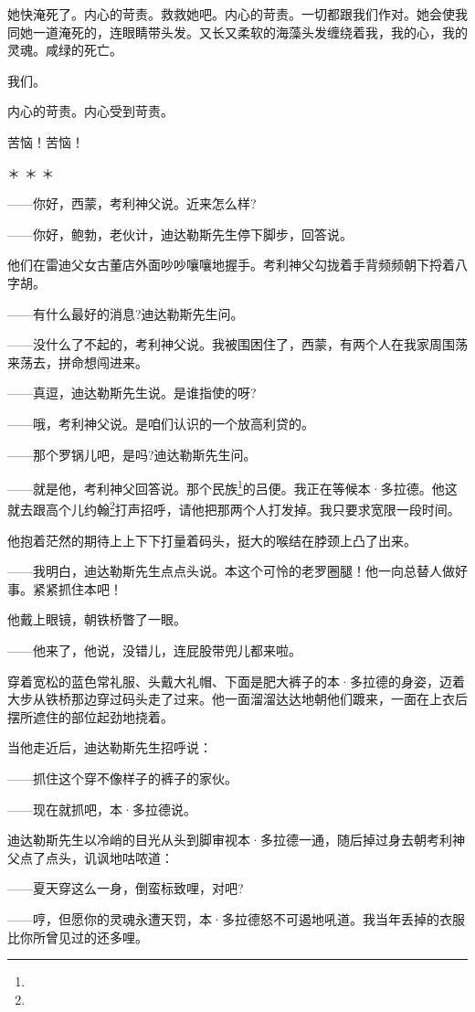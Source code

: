 \par 她快淹死了。内心的苛责。救救她吧。内心的苛责。一切都跟我们作对。她会使我同她一道淹死的，连眼睛带头发。又长又柔软的海藻头发缠绕着我，我的心，我的灵魂。咸绿的死亡。
\par 我们。
\par 内心的苛责。内心受到苛责。
\par 苦恼！苦恼！
\par ＊ ＊ ＊
\par ——你好，西蒙，考利神父说。近来怎么样?
\par ——你好，鲍勃，老伙计，迪达勒斯先生停下脚步，回答说。
\par 他们在雷迪父女古董店外面吵吵嚷嚷地握手。考利神父勾拢着手背频频朝下捋着八字胡。
\par ——有什么最好的消息?迪达勒斯先生问。
\par ——没什么了不起的，考利神父说。我被围困住了，西蒙，有两个人在我家周围荡来荡去，拼命想闯进来。
\par ——真逗，迪达勒斯先生说。是谁指使的呀?
\par ——哦，考利神父说。是咱们认识的一个放高利贷的。
\par ——那个罗锅儿吧，是吗?迪达勒斯先生问。
\par ——就是他，考利神父回答说。那个民族\footnote{}的吕便。我正在等候本·多拉德。他这就去跟高个儿约翰\footnote{}打声招呼，请他把那两个人打发掉。我只要求宽限一段时间。
\par 他抱着茫然的期待上上下下打量着码头，挺大的喉结在脖颈上凸了出来。
\par ——我明白，迪达勒斯先生点点头说。本这个可怜的老罗圈腿！他一向总替人做好事。紧紧抓住本吧！
\par 他戴上眼镜，朝铁桥瞥了一眼。
\par ——他来了，他说，没错儿，连屁股带兜儿都来啦。
\par 穿着宽松的蓝色常礼服、头戴大礼帽、下面是肥大裤子的本·多拉德的身姿，迈着大步从铁桥那边穿过码头走了过来。他一面溜溜达达地朝他们踱来，一面在上衣后摆所遮住的部位起劲地挠着。
\par 当他走近后，迪达勒斯先生招呼说：
\par ——抓住这个穿不像样子的裤子的家伙。
\par ——现在就抓吧，本·多拉德说。
\par 迪达勒斯先生以冷峭的目光从头到脚审视本·多拉德一通，随后掉过身去朝考利神父点了点头，讥讽地咕哝道：
\par ——夏天穿这么一身，倒蛮标致哩，对吧?
\par ——哼，但愿你的灵魂永遭天罚，本·多拉德怒不可遏地吼道。我当年丢掉的衣服比你所曾见过的还多哩。
